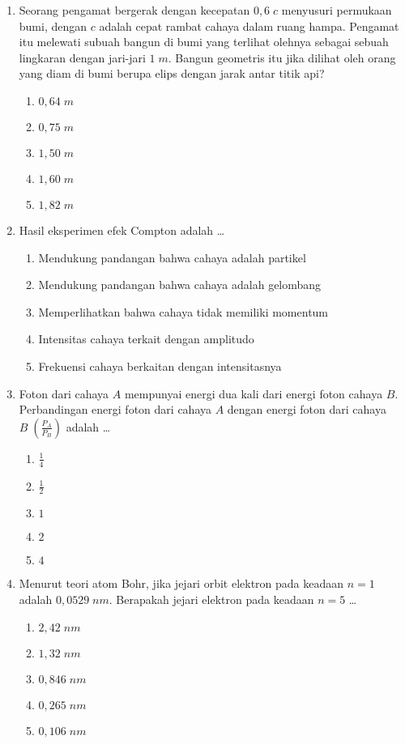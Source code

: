 \documentclass[A4,12PT, english, twocolumn]{journal}
\begin{document}
\begin{enumerate}
\item Seorang pengamat bergerak dengan kecepatan $0,6 \; c$ menyusuri permukaan bumi, dengan $c$ adalah cepat rambat cahaya dalam ruang hampa. Pengamat itu melewati subuah bangun di bumi yang terlihat olehnya sebagai sebuah lingkaran dengan jari-jari $1 \; m$. Bangun geometris itu jika dilihat oleh orang yang diam di bumi berupa elips dengan jarak antar titik api?
    \begin{enumerate}
        \item $0,64 \; m$
        \item $0,75 \; m$
        \item $1,50 \; m$
        \item $1,60 \; m$
        \item $1,82 \; m$
    \end{enumerate}

\item Hasil eksperimen efek Compton adalah \dots
    \begin{enumerate}
        \item Mendukung pandangan bahwa cahaya adalah partikel
        \item Mendukung pandangan bahwa cahaya adalah gelombang
        \item Memperlihatkan bahwa cahaya tidak memiliki momentum
        \item Intensitas cahaya terkait dengan amplitudo
        \item Frekuensi cahaya berkaitan dengan intensitasnya
    \end{enumerate}

\item Foton dari cahaya $A$ mempunyai energi dua kali dari energi foton cahaya $B$. Perbandingan energi foton dari cahaya $A$ dengan energi foton dari cahaya $B \; \left(\frac{P_A}{P_B} \right)$ adalah \dots
    \begin{enumerate}
        \item $\frac{1}{4}$
        \item $\frac{1}{2}$
        \item $1$
        \item $2$
        \item $4$
    \end{enumerate}

\item Menurut teori atom Bohr, jika jejari orbit elektron pada keadaan $n=1$ adalah $0,0529 \; nm$. Berapakah jejari elektron pada keadaan $n=5$ \dots
    \begin{enumerate}
        \item $2,42 \; nm$
        \item $1,32 \; nm$
        \item $0,846 \; nm$
        \item $0,265 \; nm$
        \item $0,106\; nm$
    \end{enumerate}

\end{enumerate}
\end{document}
